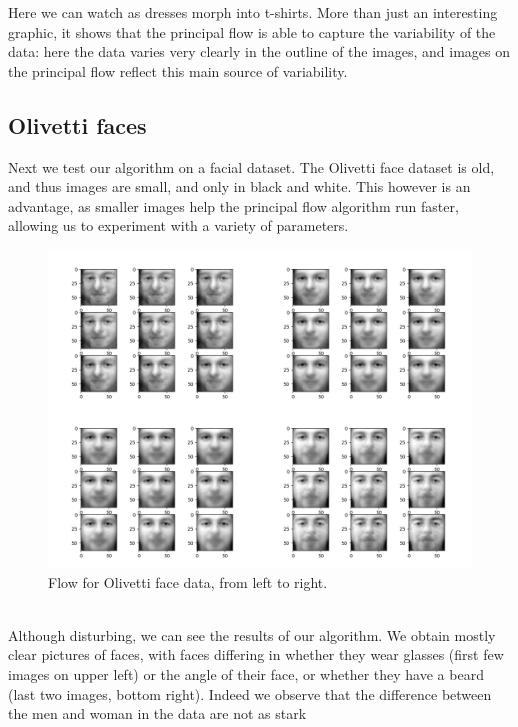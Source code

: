 \documentclass[12pt]{report}
\begin{document}
Here we can watch as dresses morph into t-shirts. More than just an interesting graphic,
it shows that the principal flow is able to capture the variability of the data:
here the data varies very clearly in the outline of the images, and images on the
principal flow reflect this main source of variability.
\fi
\newpage
\subsection{Olivetti faces}

Next we test our algorithm on a facial dataset. The Olivetti face dataset is old,
and thus images are small, and only in black and white. This however is 
an advantage, as smaller images help the principal flow algorithm run faster,
allowing us to experiment with a variety of parameters.\\
\begin{figure}[ht]
    \begin{center}
        \includegraphics[scale=0.35]{main_olivetti_30_01.png}
        \caption{Flow for Olivetti face data, from left to right.}
        \label{fig:olivettiflows}
    \end{center}
\end{figure}\\
Although disturbing, we can see the results of our algorithm. 
We obtain mostly clear pictures of faces, with faces differing
in whether they wear glasses (first few images on upper left) or 
the angle of their face, or whether they have a beard (last two images, 
bottom right). Indeed
we observe that the difference between the men and woman in the data are not as stark
\end{document}
